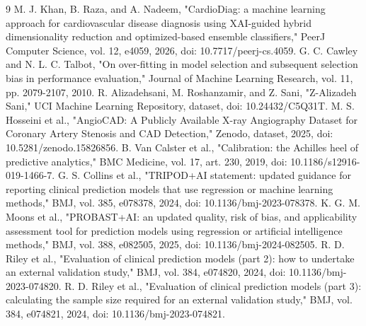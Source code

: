 \documentclass[conference]{IEEEtran}
\begin{document}
\begin{thebibliography}{9}
 M. J. Khan, B. Raza, and A. Nadeem, "CardioDiag: a machine learning approach for cardiovascular disease diagnosis using XAI-guided hybrid dimensionality reduction and optimized-based ensemble classifiers," PeerJ Computer Science, vol. 12, e4059, 2026, doi: 10.7717/peerj-cs.4059.
 G. C. Cawley and N. L. C. Talbot, "On over-fitting in model selection and subsequent selection bias in performance evaluation," Journal of Machine Learning Research, vol. 11, pp. 2079-2107, 2010.
 R. Alizadehsani, M. Roshanzamir, and Z. Sani, "Z-Alizadeh Sani," UCI Machine Learning Repository, dataset, doi: 10.24432/C5Q31T.
 M. S. Hosseini et al., "AngioCAD: A Publicly Available X-ray Angiography Dataset for Coronary Artery Stenosis and CAD Detection," Zenodo, dataset, 2025, doi: 10.5281/zenodo.15826856.
 B. Van Calster et al., "Calibration: the Achilles heel of predictive analytics," BMC Medicine, vol. 17, art. 230, 2019, doi: 10.1186/s12916-019-1466-7.
 G. S. Collins et al., "TRIPOD+AI statement: updated guidance for reporting clinical prediction models that use regression or machine learning methods," BMJ, vol. 385, e078378, 2024, doi: 10.1136/bmj-2023-078378.
 K. G. M. Moons et al., "PROBAST+AI: an updated quality, risk of bias, and applicability assessment tool for prediction models using regression or artificial intelligence methods," BMJ, vol. 388, e082505, 2025, doi: 10.1136/bmj-2024-082505.
 R. D. Riley et al., "Evaluation of clinical prediction models (part 2): how to undertake an external validation study," BMJ, vol. 384, e074820, 2024, doi: 10.1136/bmj-2023-074820.
 R. D. Riley et al., "Evaluation of clinical prediction models (part 3): calculating the sample size required for an external validation study," BMJ, vol. 384, e074821, 2024, doi: 10.1136/bmj-2023-074821.
\end{thebibliography}
\end{document}
